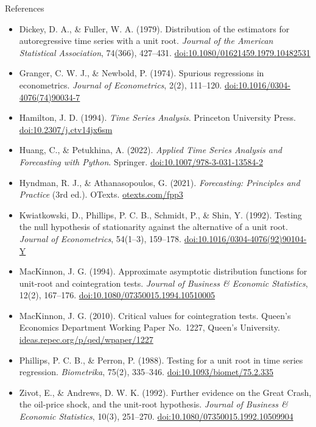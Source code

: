 \begin{frame}{References}
\itemsize{\tiny}
\begin{itemize}
    \item Dickey, D. A., \& Fuller, W. A. (1979). Distribution of the estimators for autoregressive time series with a unit root. \textit{Journal of the American Statistical Association}, 74(366), 427--431. \href{https://doi.org/10.1080/01621459.1979.10482531}{doi:10.1080/01621459.1979.10482531}
    \item Granger, C. W. J., \& Newbold, P. (1974). Spurious regressions in econometrics. \textit{Journal of Econometrics}, 2(2), 111--120. \href{https://doi.org/10.1016/0304-4076(74)90034-7}{doi:10.1016/0304-4076(74)90034-7}
    \item Hamilton, J. D. (1994). \textit{Time Series Analysis}. Princeton University Press. \href{https://doi.org/10.2307/j.ctv14jx6sm}{doi:10.2307/j.ctv14jx6sm}
    \item Huang, C., \& Petukhina, A. (2022). \textit{Applied Time Series Analysis and Forecasting with Python}. Springer. \href{https://doi.org/10.1007/978-3-031-13584-2}{doi:10.1007/978-3-031-13584-2}
    \item Hyndman, R. J., \& Athanasopoulos, G. (2021). \textit{Forecasting: Principles and Practice} (3rd ed.). OTexts. \href{https://otexts.com/fpp3/}{otexts.com/fpp3}
    \item Kwiatkowski, D., Phillips, P. C. B., Schmidt, P., \& Shin, Y. (1992). Testing the null hypothesis of stationarity against the alternative of a unit root. \textit{Journal of Econometrics}, 54(1--3), 159--178. \href{https://doi.org/10.1016/0304-4076(92)90104-Y}{doi:10.1016/0304-4076(92)90104-Y}
    \item MacKinnon, J. G. (1994). Approximate asymptotic distribution functions for unit-root and cointegration tests. \textit{Journal of Business \& Economic Statistics}, 12(2), 167--176. \href{https://doi.org/10.1080/07350015.1994.10510005}{doi:10.1080/07350015.1994.10510005}
    \item MacKinnon, J. G. (2010). Critical values for cointegration tests. Queen's Economics Department Working Paper No.~1227, Queen's University. \href{https://ideas.repec.org/p/qed/wpaper/1227.html}{ideas.repec.org/p/qed/wpaper/1227}
    \item Phillips, P. C. B., \& Perron, P. (1988). Testing for a unit root in time series regression. \textit{Biometrika}, 75(2), 335--346. \href{https://doi.org/10.1093/biomet/75.2.335}{doi:10.1093/biomet/75.2.335}
    \item Zivot, E., \& Andrews, D. W. K. (1992). Further evidence on the Great Crash, the oil-price shock, and the unit-root hypothesis. \textit{Journal of Business \& Economic Statistics}, 10(3), 251--270. \href{https://doi.org/10.1080/07350015.1992.10509904}{doi:10.1080/07350015.1992.10509904}
\end{itemize}
\end{frame}


